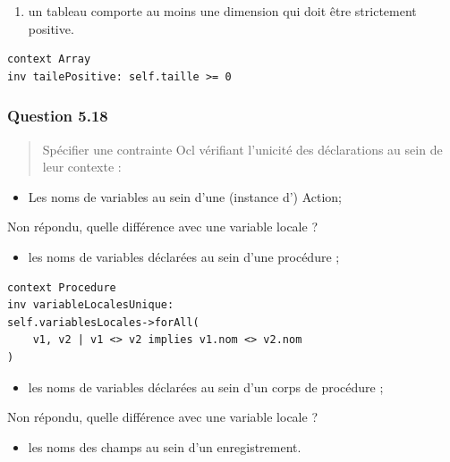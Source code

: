 \documentclass[]{article}
\providecommand{\tightlist}{%
  \setlength{\itemsep}{0pt}\setlength{\parskip}{0pt}}
\begin{document}
\begin{enumerate}
\def\labelenumi{\arabic{enumi})}
\setcounter{enumi}{1}
\tightlist
\item
  un tableau comporte au moins une dimension qui doit être strictement
  positive.
\end{enumerate}

\begin{verbatim}
context Array
inv tailePositive: self.taille >= 0
\end{verbatim}

\hypertarget{question-5.18}{%
\subsubsection{Question 5.18}\label{question-5.18}}

\begin{quote}
Spécifier une contrainte Ocl vérifiant l'unicité des déclarations au
sein de leur contexte :
\end{quote}

\begin{itemize}
\tightlist
\item
  Les noms de variables au sein d'une (instance d') Action;
\end{itemize}

Non répondu, quelle différence avec une variable locale ?

\begin{itemize}
\tightlist
\item
  les noms de variables déclarées au sein d'une procédure ;
\end{itemize}

\begin{verbatim}
context Procedure
inv variableLocalesUnique:
self.variablesLocales->forAll(
    v1, v2 | v1 <> v2 implies v1.nom <> v2.nom
)
\end{verbatim}

\begin{itemize}
\tightlist
\item
  les noms de variables déclarées au sein d'un corps de procédure ;
\end{itemize}

Non répondu, quelle différence avec une variable locale ?

\begin{itemize}
\tightlist
\item
  les noms des champs au sein d'un enregistrement.
\end{itemize}
\end{document}
